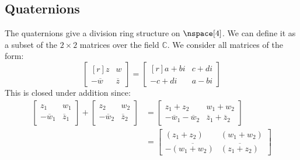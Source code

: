 \documentclass{book}                                                           %
\begin{document}
        \subsection{Quaternions}
            The quaternions give a division ring structure on $\nspace[4]$.
            We can define it as a subset of the $2\times{2}$ matrices over
            the field $\mathbb{C}$. We consider all matrices of the form:
            \begin{equation}
                \begin{bmatrix*}[r]
                    z&w\\
                    \minus\overline{w}&\overline{z}
                \end{bmatrix*}
                =
                \begin{bmatrix*}[r]
                    a+bi&c+di\\
                    \minus{c}+di&a-bi
                \end{bmatrix*}
            \end{equation}
            This is closed under addition since:
            \begin{subequations}
                \begin{align}
                    \begin{bmatrix}
                        z_{1}&w_{1}\\[1.2ex]
                        \minus\overline{w}_{1}&\overline{z}_{1}
                    \end{bmatrix}
                    +
                    \begin{bmatrix}
                        z_{2}&w_{2}\\[1.2ex]
                        \minus\overline{w}_{2}&\overline{z}_{2}
                    \end{bmatrix}
                    &=
                    \begin{bmatrix}
                        z_{1}+z_{2}&w_{1}+w_{2}\\[1.2ex]
                        \minus\overline{w}_{1}-\overline{w}_{2}
                        &\overline{z}_{1}+\overline{z}_{2}
                    \end{bmatrix}\\
                    &=
                    \begin{bmatrix}
                        (z_{1}+z_{2})&(w_{1}+w_{2})\\[1.2ex]
                        \minus\overline{(w_{1}+w_{2})}
                            &\overline{(z_{1}+z_{2})}
                    \end{bmatrix}
                \end{align}
            \end{subequations}
\end{document}

